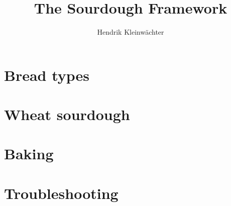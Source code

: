 \documentclass[paper=a4, twoside=false, fontsize=12pt, parskip=half,
                bibliography=totoc, listof=totoc]{scrbook}
\author{Hendrik Kleinwächter}
\title{The Sourdough Framework}
\begin{document}

\titlepage

\frontmatter
{%
\hypersetup{hidelinks}
\ifdefined\HCode\else\tableofcontents\fi
}





\mainmatter











\chapter{Bread types}


\chapter{Wheat sourdough}%
\label{chapter:wheat-sourdough}




% 
\chapter{Baking}%
\label{chapter:baking}




\chapter{Troubleshooting}


\backmatter

{%
\hypersetup{hidelinks}
\listofflowcharts
\listoftables
\listoffigures
}
\printbibliography
\end{document}
